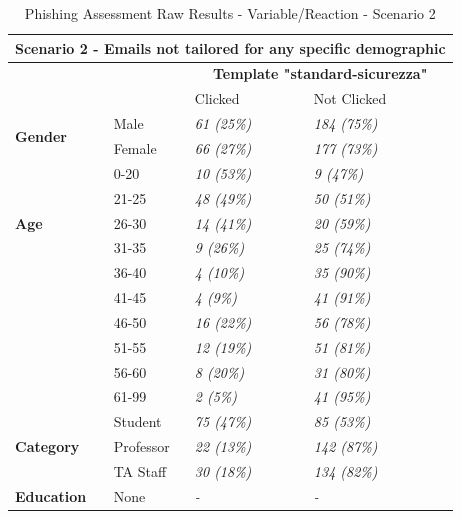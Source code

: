 \documentclass[a4paper]{article}
\begin{document}
\begingroup
\renewcommand{\arraystretch}{1.25}
\begin{table}[ht]
\begin{center}
    \begin{tabular}{ | m{7em} | m{9em} | m{9em} | m{9em} | }
    \hline
    \multicolumn{4}{|c|}{\textbf{Scenario 2 - Emails not tailored for any specific demographic}} \\ \hline
    & & \multicolumn{2}{|c|}{\textbf{Template "standard-sicurezza"}} \\ \hline
    & & Clicked & Not Clicked \\ \hline
    
    \multirow{2}{*}{\textbf{Gender}} 
    & Male & \textit{61 (25\%)} & \textit{184 (75\%)} \\ \cline{2-4}
    & Female & \textit{66 (27\%)} & \textit{177 (73\%)} \\ \hline
    
    \multirow{5}{*}{\textbf{Age}} 
    & 0-20 & \textit{10 (53\%)} & \textit{9 (47\%)} \\ \cline{2-4}
    & 21-25 & \textit{48 (49\%)} & \textit{50 (51\%)} \\ \cline{2-4}
    & 26-30 & \textit{14 (41\%)} & \textit{20 (59\%)} \\ \cline{2-4}
    & 31-35 & \textit{9 (26\%)} & \textit{25 (74\%)} \\ \cline{2-4}
    & 36-40 & \textit{4 (10\%)} & \textit{35 (90\%)} \\ \cline{2-4}
    & 41-45 & \textit{4 (9\%)} & \textit{41 (91\%)} \\ \cline{2-4}
    & 46-50 & \textit{16 (22\%)} & \textit{56 (78\%)} \\ \cline{2-4}
    & 51-55 & \textit{12 (19\%)} & \textit{51 (81\%)} \\ \cline{2-4}
    & 56-60 & \textit{8 (20\%)} & \textit{31 (80\%)} \\ \cline{2-4}
    & 61-99 & \textit{2 (5\%)} & \textit{41 (95\%)} \\ \hline
    
    \multirow{3}{*}{\textbf{Category}} 
    & Student & \textit{75 (47\%)} & \textit{85 (53\%)} \\ \cline{2-4}
    & Professor & \textit{22 (13\%)} & \textit{142 (87\%)} \\ \cline{2-4}
    & TA Staff & \textit{30 (18\%)} & \textit{134 (82\%)} \\ \hline
    
    \multirow{1}{*}{\textbf{Education}}
    & None & \textit{-} & \textit{-} \\ \hline
    \end{tabular}
\end{center}
\caption{Phishing Assessment Raw Results - Variable/Reaction - Scenario 2}
\label{t-varreact2}
\end{table}
\endgroup
\end{document}
